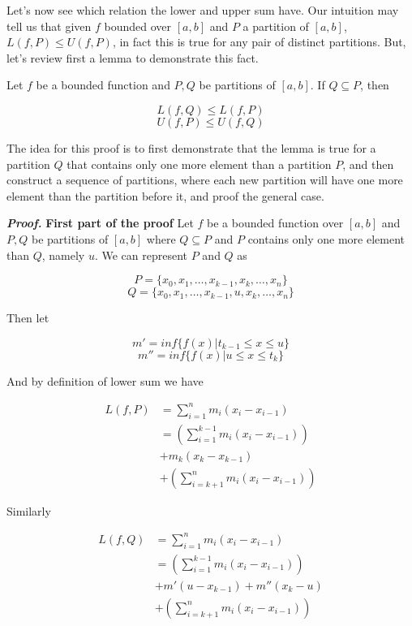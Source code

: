 \documentclass{report}
\begin{document}
    Let's now see which relation the lower and upper sum have. Our intuition may tell us that given $f$ bounded over $[a,b]$ and $P$ a partition of $[a,b]$, $L(f, P) \leq U(f, P)$, in fact this is true for any pair of distinct partitions. But, let's review first a lemma to demonstrate this fact.

    \begin{lemBox}
        Let $f$ be a bounded function and $P, Q$ be partitions of $[a,b]$. If $Q \subseteq P$, then

        $$L(f, Q) \leq L(f, P) $$
        $$U(f, P) \leq U(f, Q) $$
    \end{lemBox}

    \begin{ideaBox}
        The idea for this proof is to first demonstrate that the lemma is true for a partition $Q$ that contains only one more element than a partition $P$, and then construct a sequence of partitions, where each new partition will have one more element than the partition before it, and proof the general case.
    \end{ideaBox}

    \textit{\textbf{Proof.}}
    \noindent\textbf{First part of the proof}
    Let $f$ be a bounded function over $[a,b]$ and $P, Q$ be partitions of $[a,b]$ where $Q \subseteq P$ and $P$ contains only one more element than $Q$, namely $u$. We can represent $P$ and $Q$ as

    $$P = \{x_0,x_1,\dots,x_{k-1},x_k,\dots,x_n\}$$
    $$Q = \{x_0,x_1,\dots,x_{k-1},u,x_k,\dots,x_n\}$$

    Then let

    $$m' = inf\{f(x) | t_{k-1} \leq x \leq u\}$$
    $$m'' = inf\{f(x) | u \leq x \leq t_k\}$$

    And by definition of lower sum we have

    \begin{align*}
        L(f,P) &= \sum_{i=1}^{n} m_i(x_i-x_{i-1})\\
        &= \left(\sum_{i=1}^{k-1}m_i(x_i-x_{i-1})\right) \\
        &+ m_k(x_k-x_{k-1}) \\
        &+ \left(\sum_{i=k+1}^{n}m_i(x_i-x_{i-1})\right)
    \end{align*}

    Similarly

    \begin{align*}
        L(f,Q) &= \sum_{i=1}^{n} m_i(x_i-x_{i-1})\\
        &= \left(\sum_{i=1}^{k-1}m_i(x_i-x_{i-1})\right)\\
        &+ m'(u-x_{k-1}) + m''(x_k-u)\\
        &+ \left(\sum_{i=k+1}^{n}m_i(x_i-x_{i-1})\right)
    \end{align*}
\end{document}
